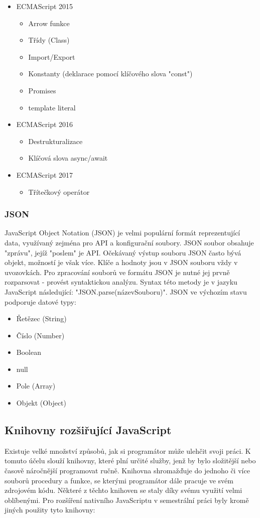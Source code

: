 \begin{itemize}
\item ECMAScript 2015
\begin{itemize}
\item Arrow funkce
\item Třídy (Class)
\item Import/Export
\item Konstanty (deklarace pomocí klíčového slova "const")
\item Promises
\item template literal
\end{itemize}
\item ECMAScript 2016
\begin{itemize}
\item Destrukturalizace
\item Klíčová slova async/await
\end{itemize}
\item ECMAScript 2017
\begin{itemize}
\item Třítečkový operátor
\end{itemize}
\end{itemize}

\subsubsection{JSON}
JavaScript Object Notation (JSON) je velmi populární formát reprezentující data, využívaný zejména pro API a konfigurační soubory. JSON soubor obsahuje "zprávu", jejíž "poslem" je API. Očekávaný výstup souboru JSON často bývá objekt, možností je však více.  Klíče a hodnoty jsou v JSON souboru vždy v uvozovkách. Pro zpracování souborů ve formátu JSON je nutné jej prvně rozparsovat - provést syntaktickou analýzu. Syntax této metody je v jazyku JavaScript následující: "JSON.parse(názevSouboru)". JSON ve výchozím stavu podporuje datové typy:
\begin{itemize}
\item Řetězec (String)
\item Číslo (Number)
\item Boolean
\item null
\item Pole (Array)
\item Objekt (Object)
\end{itemize}

\subsection{Knihovny rozšiřující JavaScript}
Existuje velké množství způsobů, jak si programátor může ulehčit svoji práci. K tomuto účelu slouží knihovny, které plní určité služby, jenž by bylo složitější nebo časově náročnější programovat ručně. Knihovna shromažďuje do jednoho či více souborů procedury a funkce, se kterými programátor dále pracuje ve svém zdrojovém kódu. Některé z těchto knihoven se staly díky svému využití velmi oblíbenými. Pro rozšíření nativního JavaScriptu v semestrální práci byly kromě jiných použity tyto knihovny:

